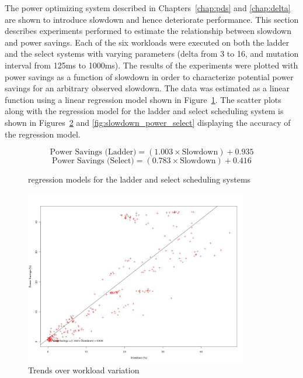 The power optimizing system described in Chapters~\ref{chap:pds} and \ref{chap:delta} are shown
to introduce slowdown and hence deteriorate performance. This section describes experiments 
performed to estimate the relationship between slowdown and power savings. Each of the six
workloads were executed on both the ladder and the select systems with varying parameters
(delta from 3 to 16, and mutation interval from 125ms to 1000ms). The results of the experiments
were plotted with power savings as a function of slowdown in order to characterize potential 
power savings for an arbitrary observed slowdown. The data was estimated as a linear function
using a linear regression model shown in Figure~\ref{fig:regression}. The scatter plots along
with the regression model for the ladder and select scheduling system is shown in Figures~\ref{fig:slowdown_power_ladder}
and \ref{fig:slowdown_power_select} displaying the accuracy of the regression model. 

\begin{figure}[h!]
   \begin{equation*}
      \text{Power Savings (Ladder)} = (1.003 \times \text{Slowdown}) + 0.935
    \end{equation*}
    \begin{equation*}
     \text{Power Savings (Select)}  = (0.783 \times \text{Slowdown}) + 0.416
  \end{equation*}
  \caption{regression models for the ladder and select scheduling systems}
  \label{fig:regression}
\end{figure}

\begin{figure}[h!]
  \begin{center}
    \includegraphics[height=3.0in]{figures/slowdown_power_ladder.jpg}%
    \caption{Trends over workload variation}
    \label{fig:slowdown_power_ladder}
  \end{center}
\end{figure}

